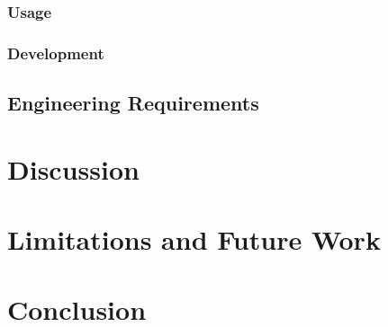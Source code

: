 \subsection{Usage}

\subsection{Development}


\section{Engineering Requirements}


\chapter{Discussion}


\chapter{Limitations and Future Work}


\chapter{Conclusion}